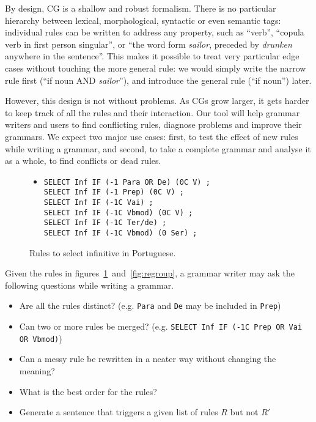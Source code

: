 By design, CG is a shallow and robust formalism. 
There is no particular hierarchy between lexical, morphological,
syntactic or even semantic tags: individual rules can be written to address any
property, such as ``verb'', ``copula verb in first person singular'',
or ``the word form \emph{sailor}, preceded by \emph{drunken} anywhere in the
sentence''. This makes it possible to treat very particular edge
cases without touching the more general rule: we would simply write
the narrow rule first (``if noun AND \emph{sailor}''), and introduce
the general rule (``if noun'') later.


However, this design is not without problems. As CGs grow larger, it
gets harder to keep track of all the rules and their interaction.
Our tool will help grammar writers and users to find conflicting
rules, diagnose problems and improve their grammars. 
We expect two major use cases: 
first, to test the effect of new rules while writing a grammar, and
second, to take a complete grammar and analyse it as a whole, to find
conflicts or dead rules.



\begin{figure}[t]
\centering

\begin{itemize}
\item[]
\begin{verbatim}SELECT Inf IF (-1 Para OR De) (0C V) ;
SELECT Inf IF (-1 Prep) (0C V) ;
SELECT Inf IF (-1C Vai) ;
SELECT Inf IF (-1C Vbmod) (0C V) ;
SELECT Inf IF (-1C Ter/de) ;
SELECT Inf IF (-1C Vbmod) (0 Ser) ;
\end{verbatim}
\end{itemize}

\caption{Rules to select infinitive in Portuguese.}

\label{fig:infrules}
\end{figure}






Given the rules in figures~\ref{fig:infrules}~and~\ref{fig:regroup}, a
grammar writer may ask the following questions while writing a grammar. 

\begin{itemize}
\item Are all the rules distinct? (e.g. \texttt{Para} and \texttt{De} may be included in \texttt{Prep})
\item Can two or more rules be merged? (e.g. \texttt{SELECT Inf IF
    (-1C Prep OR Vai OR Vbmod)})
\item Can a messy rule be rewritten in a neater way without changing the meaning?
\item What is the best order for the rules?
\item Generate a sentence that triggers a given list of rules $R$ but not $R'$ 
\end{itemize}

